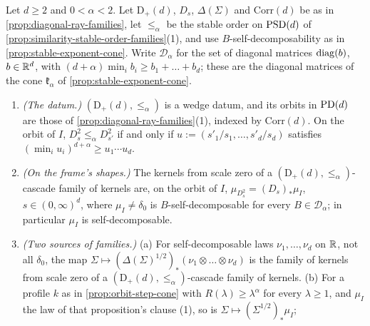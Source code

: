 \begin{proposition}
\label{prop:diagonal-stable-order-families}
\leanok
Let $d \ge 2$ and $0 < \alpha < 2$. Let $\mathrm D_+(d)$, $D_s$, $\Delta(\Sigma)$ and $\mathrm{Corr}(d)$ be as
in \ref{prop:diagonal-ray-families}, let $\le_\alpha$ be the stable order on $\mathrm{PSD}(d)$ of
\ref{prop:similarity-stable-order-families}(1), and use $B$-self-decomposability as in
\ref{prop:stable-exponent-cone}. Write $\mathcal D_\alpha$ for the set of diagonal matrices $\operatorname{diag}(b)$,
$b \in \mathbb{R}^d$, with $(d+\alpha)\min_ib_i \ge b_1 + \dots + b_d$; these are the diagonal matrices of the
cone $\mathfrak k_\alpha$ of \ref{prop:stable-exponent-cone}.
\begin{enumerate}
\item \emph{(The datum.)} $(\mathrm D_+(d), \le_\alpha)$ is a wedge datum, and its orbits in $\mathrm{PD}(d)$ are
those of \ref{prop:diagonal-ray-families}(1), indexed by $\mathrm{Corr}(d)$. On the orbit of $I$,
$D_s^2 \le_\alpha D_{s'}^2$ if and only if $u := (s'_1/s_1, \dots, s'_d/s_d)$ satisfies
$(\min_iu_i)^{d+\alpha} \ge u_1\cdots u_d$.
\item \emph{(On the frame's shapes.)} The kernels from scale zero of a
$(\mathrm D_+(d), \le_\alpha)$-cascade family of kernels are, on the orbit of $I$,
$\mu_{D_s^2} = (D_s)_*\mu_I$, $s \in (0,\infty)^d$, where $\mu_I \ne \delta_0$ is $B$-self-decomposable for
every $B \in \mathcal D_\alpha$; in particular $\mu_I$ is self-decomposable.
\item \emph{(Two sources of families.)} (a) For self-decomposable laws $\nu_1, \dots, \nu_d$ on $\mathbb{R}$, not
all $\delta_0$, the map $\Sigma \mapsto (\Delta(\Sigma)^{1/2})_*(\nu_1 \otimes \dots \otimes \nu_d)$ is the
family of kernels from scale zero of a $(\mathrm D_+(d), \le_\alpha)$-cascade family of kernels.
(b) For a profile $k$ as in \ref{prop:orbit-step-cone} with $R(\lambda) \ge \lambda^\alpha$ for every
$\lambda \ge 1$, and $\mu_I$ the law of that proposition's clause (1), so is $\Sigma \mapsto (\Sigma^{1/2})_*\mu_I$;

\end{enumerate}
\end{proposition}
